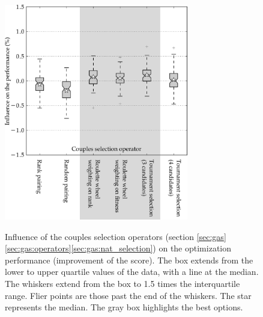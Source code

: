 \documentclass{ametsoc}
\begin{document}
\begin{figure}[t]
	\begin{center}
		\noindent\includegraphics[width=19pc,angle=0]{fig05.pdf}\\
	\end{center}
	\caption{Influence of the couples selection operators (section \ref{sec:gas}\ref{sec:gas:operators}\ref{sec:gas:nat_selection}) on the optimization performance (improvement of the score). The box extends from the lower to upper quartile values of the data, with a line at the median. The whiskers extend from the box to 1.5 times the interquartile range. Flier points are those past the end of the whiskers. The star represents the median. The gray box highlights the best options.}
	\label{fig:operator_selectcoupl_score}
\end{figure}
\end{document}
